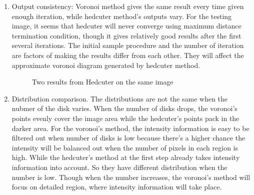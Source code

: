 \documentclass[11pt]{article}
\begin{document}
\begin{enumerate}
  \item Output consistency: Voronoi method gives the same result every time given enough iteration, while hedcuter method's outputs vary. For the testing image, it seems that hedcuter will never converge using maximum distance termination condition, though it gives relatively good results after the first several iterations. The initial sample procedure and the number of iteration are factors of making the results differ from each other. They will affect the approximate voronoi diagram generated by hedcuter method.
  \begin{figure}[h!]
      \centering
      \qquad
      \caption{Two results from Hedcuter on the same image}
      \label{fig:consistency}
  \end{figure}
  \item Distribution comparison. The distributions are not the same when the nubmer of the disk varies. When the number of disks drops, the voronoi's points evenly cover the image area while the hedcuter's points pack in the darker area. For the voronoi's method, the intensity information is easy to be filtered out when number of disks is low because there's a higher chance the intensity will be balanced out when the number of pixels in each region is high. While the hedcuter's method at the first step already takes intensity information into account. So they have different distribution when the number is low. Though when the number increases, the voronoi's method will focus on detailed region, where intensity information will take place.

\end{enumerate}
\end{document}
